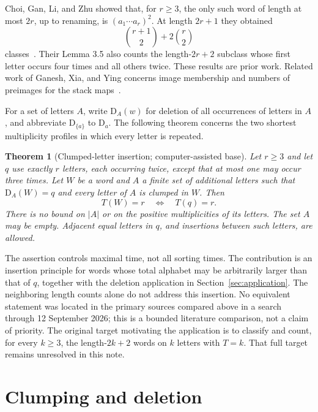 \documentclass[11pt,a4paper]{article}
\newtheorem{theorem}{Theorem}
\newcommand{\D}{\mathrm{D}}
\begin{document}
Choi, Gan, Li, and Zhu showed that, for $r\geq3$, the only such word of
length at most $2r$, up to renaming, is $(a_1\cdots a_r)^2$. At length
$2r+1$ they obtained
\[
 \binom{r+1}{2}+2\binom r2
\]
classes~\cite[Theorems 1.1--1.2]{ChoiGanLiZhu2025}. Their Lemma 3.5 also
counts the length-$2r+2$ subclass whose first letter occurs four times and
all others twice. These results are prior work. Related work of Ganesh,
Xia, and Ying concerns image membership and numbers of preimages for the
stack maps~\cite[Sections 3--4]{GaneshXiaYing2024}.

For a set of letters $A$, write $\D_A(w)$ for deletion of all occurrences
of letters in $A$, and abbreviate $\D_{\{a\}}$ to $\D_a$.
The following theorem concerns the two shortest multiplicity profiles in
which every letter is repeated.

\begin{theorem}[Clumped-letter insertion; computer-assisted base]
\label{thm:main}
Let $r\geq3$ and let $q$ use exactly $r$ letters, each occurring twice,
except that at most one may occur three times. Let $W$ be a word and $A$ a
finite set of additional letters such that $\D_A(W)=q$ and every letter of
$A$ is clumped in $W$. Then
\begin{equation}\label{eq:main}
 T(W)=r\quad\Longleftrightarrow\quad T(q)=r.
\end{equation}
There is no bound on $|A|$ or on the positive multiplicities of its letters.
The set $A$ may be empty. Adjacent equal letters in $q$, and insertions
between such letters, are allowed.
\end{theorem}

The assertion controls maximal time, not all sorting times.
The contribution is an insertion principle for words whose total alphabet
may be arbitrarily larger than that of $q$, together with the deletion
application in Section~\ref{sec:application}. The neighboring length counts
alone do not address this insertion. No equivalent statement was located
in the primary sources compared above in a search through 12 September
2026; this is a bounded literature comparison, not a claim of priority.
The original target motivating the application is to classify and count,
for every $k\geq3$, the length-$2k+2$ words on $k$ letters with $T=k$.
That full target remains unresolved in this note.

\section{Clumping and deletion}
\end{document}
